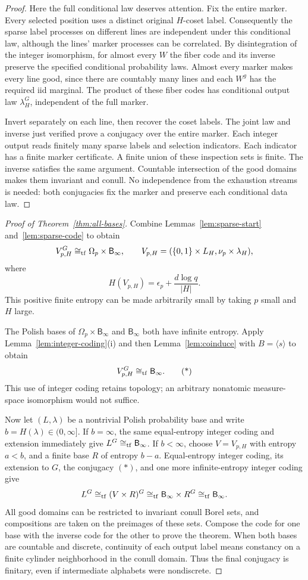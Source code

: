 \documentclass[11pt,a4paper]{article}
\numberwithin{equation}{section}
\newcommand{\Binf}{\mathsf B_\infty}
\begin{document}
\begin{proof}
Here the full conditional law deserves attention. Fix the entire
marker. Every selected position uses a distinct original $H$-coset
label. Consequently the sparse label processes on different lines
are independent under this conditional law, although the lines'
marker processes can be correlated. By disintegration of the
integer isomorphism, for almost every $W$ the fiber code and its
inverse preserve the specified conditional probability laws.
Almost every marker makes every line good, since there are
countably many lines and each $W^g$ has the required iid marginal.
The product of these fiber codes has conditional output law
$\lambda_H^G$, independent of the full marker.

Invert separately on each line, then recover the coset labels.
The joint law and inverse just verified prove a conjugacy over the
entire marker. Each integer output reads finitely many sparse
labels and selection indicators. Each indicator has a finite
marker certificate. A finite union of these inspection sets is
finite. The inverse satisfies the same argument. Countable
intersection of the good domains makes them invariant and conull.
No independence from the exhaustion streams is needed: both
conjugacies fix the marker and preserve each conditional data law.
\end{proof}

\begin{proof}[Proof of Theorem~\ref{thm:all-bases}]
Combine Lemmas~\ref{lem:sparse-start} and~\ref{lem:sparse-code} to obtain
\[
 V_{p,H}^G\cong_{\rm tf}\Omega_p\times\Binf,\qquad
 V_{p,H}=(\{0,1\}\times L_H,\nu_p\times\lambda_H),
\]
where
\[
 H(V_{p,H})=\epsilon_p+\frac{d\log q}{|H|}.
\]
This positive finite entropy can be made arbitrarily small by
taking $p$ small and $H$ large.

The Polish bases of $\Omega_p\times\Binf$ and $\Binf$ both have
infinite entropy. Apply Lemma~\ref{lem:integer-coding}(i) and then
Lemma~\ref{lem:coinduce} with $B=\langle s\rangle$ to obtain
\[
 V_{p,H}^G\cong_{\rm tf}\Binf. \tag{*}
\]
This use of integer coding retains topology; an arbitrary nonatomic
measure-space isomorphism would not suffice.

Now let $(L,\lambda)$ be a nontrivial Polish probability base and
write $b=H(\lambda)\in(0,\infty]$. If $b=\infty$, the same
equal-entropy integer coding and extension immediately give
$L^G\cong_{\rm tf}\Binf$.
If $b<\infty$, choose $V=V_{p,H}$ with entropy $a<b$, and a finite
base $R$ of entropy $b-a$. Equal-entropy integer coding, its
extension to $G$, the conjugacy $(*)$, and one more
infinite-entropy integer coding give
\[
 L^G\cong_{\rm tf}(V\times R)^G
     \cong_{\rm tf}\Binf\times R^G
     \cong_{\rm tf}\Binf .
\]
All good domains can be restricted to invariant conull Borel sets,
and compositions are taken on the preimages of these sets.
Compose the code for one base with the inverse code for the other
to prove the theorem. When both bases are countable and discrete,
continuity of each output label means constancy on a finite
cylinder neighborhood in the conull domain. Thus the final
conjugacy is finitary, even if intermediate alphabets were
nondiscrete.
\end{proof}
\end{document}

